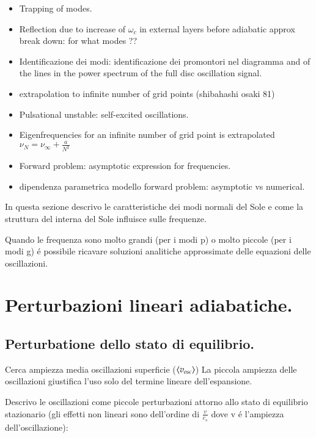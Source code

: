 \documentclass[../main.tex]{subfiles}
\begin{document}
{\begin{itemize}
    \item Trapping of modes.
    
    \item Reflection due to increase of $\omega_c$ in external layers before adiabatic approx break down: for what modes ??
    
    
    \item Identificazione dei modi: identificazione dei promontori nel diagramma \dgndi{} and of the lines in the power spectrum of the full disc oscillation signal.
    \item extrapolation to infinite number of grid points (shibahashi osaki 81)
    \item Pulsational unstable: self-excited oscillations.
    \item Eigenfrequencies for an infinite number of grid point is extrapolated $\nu_N=\nu_{\infty}+\frac{a}{N^2}$
    \item Forward problem: asymptotic expression for frequencies.
    \item dipendenza parametrica modello forward problem: asymptotic vs numerical.
\end{itemize}
}

In questa sezione descrivo le caratteristiche dei modi normali del Sole e come la struttura del interna del Sole influisce sulle frequenze.

Quando le frequenza sono molto grandi (per i modi p) o molto piccole (per i modi g) \'e possibile ricavare soluzioni analitiche approssimate delle equazioni delle oscillazioni. 

\section{Perturbazioni lineari adiabatiche.}

\subsection{Perturbatione dello stato di equilibrio.}

\begin{todo}{Cerca ampiezza media oscillazioni superficie ($\langle v_{osc} \rangle$)}
La piccola ampiezza delle oscillazioni giustifica l'uso solo del termine lineare dell'espansione.

\end{todo}

Descrivo le oscillazioni come piccole perturbazioni attorno allo stato di equilibrio stazionario (gli effetti non lineari sono dell'ordine di $\frac{v}{c_s}$ dove v \'e l'ampiezza dell'oscillazione):
\end{document}
